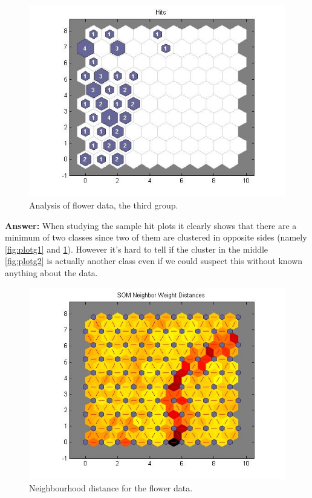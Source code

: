 \documentclass[a4paper]{article}
\begin{document}
  \begin{figure}[H] %
	 \includegraphics[scale=0.5]{q4_plotsom100_150.jpg}
	 \caption{\label{fig:plotg3} Analysis of flower data, the third group.}
 \end{figure}

\textbf{Answer: } When studying the sample hit plots it clearly shows that there are a minimum of two classes since two of them are clustered in opposite sides (namely \ref{fig:plotg1} and \ref{fig:plotg3}). However it's hard to tell if the cluster in the middle \ref{fig:plotg2} is actually another class even if we could suspect this without known anything about the data.


  \begin{figure}[H] %
	 \includegraphics[scale=0.5]{q4_100o_1900tuningphase.jpg}
	 \caption{\label{fig:neighbour} Neighbourhood distance for the flower data.}
 \end{figure}
\end{document}
